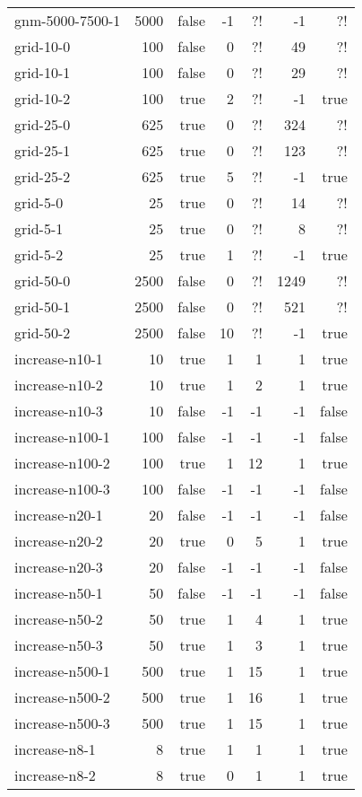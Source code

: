 \begin{longtable}{lrrrrrr}
	gnm-5000-7500-1 & 5000 & false & -1 & ?! & -1 & ?!\\
	grid-10-0 & 100 & false & 0 & ?! & 49 & ?!\\
	grid-10-1 & 100 & false & 0 & ?! & 29 & ?!\\
	grid-10-2 & 100 & true & 2 & ?! & -1 & true\\
	grid-25-0 & 625 & true & 0 & ?! & 324 & ?!\\
	grid-25-1 & 625 & true & 0 & ?! & 123 & ?!\\
	grid-25-2 & 625 & true & 5 & ?! & -1 & true\\
	grid-5-0 & 25 & true & 0 & ?! & 14 & ?!\\
	grid-5-1 & 25 & true & 0 & ?! & 8 & ?!\\
	grid-5-2 & 25 & true & 1 & ?! & -1 & true\\
	grid-50-0 & 2500 & false & 0 & ?! & 1249 & ?!\\
	grid-50-1 & 2500 & false & 0 & ?! & 521 & ?!\\
	grid-50-2 & 2500 & false & 10 & ?! & -1 & true\\
	increase-n10-1 & 10 & true & 1 & 1 & 1 & true\\
	increase-n10-2 & 10 & true & 1 & 2 & 1 & true\\
	increase-n10-3 & 10 & false & -1 & -1 & -1 & false\\
	increase-n100-1 & 100 & false & -1 & -1 & -1 & false\\
	increase-n100-2 & 100 & true & 1 & 12 & 1 & true\\
	increase-n100-3 & 100 & false & -1 & -1 & -1 & false\\
	increase-n20-1 & 20 & false & -1 & -1 & -1 & false\\
	increase-n20-2 & 20 & true & 0 & 5 & 1 & true\\
	increase-n20-3 & 20 & false & -1 & -1 & -1 & false\\
	increase-n50-1 & 50 & false & -1 & -1 & -1 & false\\
	increase-n50-2 & 50 & true & 1 & 4 & 1 & true\\
	increase-n50-3 & 50 & true & 1 & 3 & 1 & true\\
	increase-n500-1 & 500 & true & 1 & 15 & 1 & true\\
	increase-n500-2 & 500 & true & 1 & 16 & 1 & true\\
	increase-n500-3 & 500 & true & 1 & 15 & 1 & true\\
	increase-n8-1 & 8 & true & 1 & 1 & 1 & true\\
	increase-n8-2 & 8 & true & 0 & 1 & 1 & true\\

\end{longtable}
